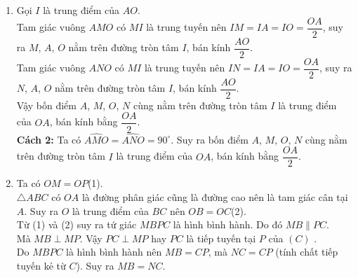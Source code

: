\begin{bt}
{\begin{center}
	\end{center}
\begin{enumerate}
	\item Gọi $I$ là trung điểm của $AO$.\\
	Tam giác vuông $AMO$ có $MI$ là trung tuyến nên $IM=IA=IO=\dfrac{OA}{2}$, suy ra $M$, $A$, $O$ nằm trên đường tròn tâm $I$, bán kính $\dfrac{AO}{2}$.\\
	Tam giác vuông $ANO$ có $MI$ là trung tuyến nên $IN=IA=IO=\dfrac{OA}{2}$, suy ra $N$, $A$, $O$ nằm trên đường tròn tâm $I$, bán kính $\dfrac{AO}{2}$.\\
	Vậy bốn điểm $A$, $M$, $O$, $N$ cùng nằm trên đường tròn tâm $I$ là trung điểm của $OA$, bán kính bằng $\dfrac{OA}{2}$.\\
\textbf{Cách 2:} Ta có $\widehat{AMO}=\widehat{ANO}=90^\circ$. Suy ra bốn điểm $A$, $M$, $O$, $N$ cùng nằm trên đường tròn tâm $I$ là trung điểm của $OA$, bán kính bằng $\dfrac{OA}{2}$.
		\item Ta có $OM=OP$\quad (1).\\
	$\triangle ABC$ có $OA$ là đường phân giác cũng là đường cao nên là tam giác cân tại $A$. Suy ra $O$ là trung điểm của $BC$ nên $OB=OC$\quad (2).\\
	Từ (1) và (2) suy ra tứ giác $MBPC$ là hình bình hành.	Do đó $MB\parallel PC$.\\
	Mà $MB\perp MP$. Vậy $PC\perp MP$ hay $PC$ là tiếp tuyến tại $P$ của $(C)$ .\\
	Do $MBPC$ là hình bình hành nên $MB=CP$, mà $NC=CP$ (tính chất tiếp tuyến kẻ từ $C$). Suy ra $MB=NC$.
\end{enumerate}
}
\end{bt}

